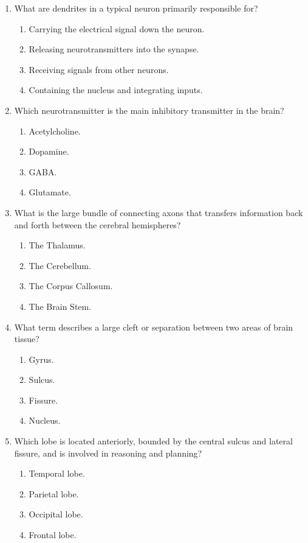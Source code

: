 \documentclass{article}
\begin{document}
\begin{enumerate}[label=\arabic*.]
\item What are dendrites in a typical neuron primarily responsible for?
\begin{enumerate}[label=(\alph*)]
    \item Carrying the electrical signal down the neuron.
    \item Releasing neurotransmitters into the synapse.
    \item Receiving signals from other neurons.
    \item Containing the nucleus and integrating inputs.
\end{enumerate}

\item Which neurotransmitter is the main inhibitory transmitter in the brain?
\begin{enumerate}[label=(\alph*)]
    \item Acetylcholine.
    \item Dopamine.
    \item GABA.
    \item Glutamate.
\end{enumerate}

\item What is the large bundle of connecting axons that transfers information back and forth between the cerebral hemispheres?
\begin{enumerate}[label=(\alph*)]
    \item The Thalamus.
    \item The Cerebellum.
    \item The Corpus Callosum.
    \item The Brain Stem.
\end{enumerate}

\item What term describes a large cleft or separation between two areas of brain tissue?
\begin{enumerate}[label=(\alph*)]
    \item Gyrus.
    \item Sulcus.
    \item Fissure.
    \item Nucleus.
\end{enumerate}

\item Which lobe is located anteriorly, bounded by the central sulcus and lateral fissure, and is involved in reasoning and planning?
\begin{enumerate}[label=(\alph*)]
    \item Temporal lobe.
    \item Parietal lobe.
    \item Occipital lobe.
    \item Frontal lobe.
\end{enumerate}


\end{enumerate}
\end{document}
